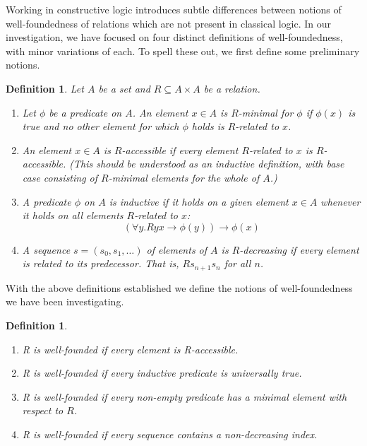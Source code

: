 \documentclass{scrartcl}
\newcommand{\sse}{\subseteq}
\newtheorem{dfn}[thm]{Definition}
\begin{document}
Working in constructive logic introduces subtle differences between notions of well-foundedness of relations
which are not present in classical logic.  In our investigation, we have focused on four distinct definitions of well-foundedness, with minor variations of each. To spell these out, we first define some preliminary notions.

\begin{dfn} Let $A$ be a set and $R \sse A \times A$ be a relation.
\begin{enumerate}
  \item Let $\phi$ be a predicate on $A$. An element $x \in A$ is $R$-minimal for $\phi$ if $\phi(x)$ is true and no other element for which $\phi$ holds is $R$-related to $x$.
  \item An element $x \in A$ is \textit{$R$-accessible} if every element $R$-related to $x$ is \textit{$R$-accessible}.  (This should be understood as an inductive definition, with base case consisting of $R$-minimal elements for the whole of $A$.)
    \item A predicate $\phi$ on $A$ is \emph{inductive} if it holds on a given element $x \in A$ whenever it holds on all elements $R$-related to $x$:
    \[ (\forall y. Ryx \to \phi(y)) \to \phi(x) \]
    \item A sequence $s = (s_0,s_1,\dots)$ of elements of $A$ is $R$-decreasing
    if every element is related to its predecessor.  That is, $Rs_{n+1}s_n$ for all $n$.
\end{enumerate}
\end{dfn}
With the above definitions established we define the notions of well-foundedness we have been investigating.
\begin{dfn} \hfil
  \begin{enumerate}
    \item \textit{R} is well-founded if every element is \textit{R}-accessible.
    \item \textit{R} is well-founded if every inductive predicate is universally true.
    \item \textit{R} is well-founded if every non-empty predicate has a minimal element with respect to $R$.
    \item \textit{R} is well-founded if every sequence contains a non-decreasing index.
  \end{enumerate}
\end{dfn}
\end{document}
